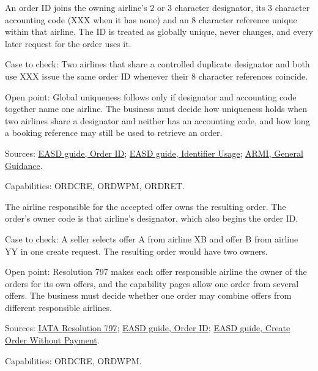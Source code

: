\begin{definition}[Order ID (C-77)]
  \label{def:order-creation-order-id}
  \notready
  An order ID joins the owning airline's 2 or 3 character designator, its 3
  character accounting code (XXX when it has none) and an 8 character
  reference unique within that airline. The ID is treated as globally
  unique, never changes, and every later request for the order uses it.

  Case to check: Two airlines that share a controlled duplicate designator
  and both use XXX issue the same order ID whenever their 8 character
  references coincide.

  Open point: Global uniqueness follows only if designator and accounting
  code together name one airline. The business must decide how uniqueness
  holds when two airlines share a designator and neither has an accounting
  code, and how long a booking reference may still be used to retrieve an
  order.

  Sources: \href{https://standards.atlassian.net/wiki/spaces/EASD/pages/574259647/Order+ID}{EASD guide, Order ID};
  \href{https://standards.atlassian.net/wiki/spaces/EASD/pages/574226512/Identifier+Usage}{EASD guide, Identifier Usage};
  \href{https://standards.atlassian.net/wiki/spaces/ARMI/pages/584318980/General+Guidance}{ARMI, General Guidance}.

  Capabilities: ORDCRE, ORDWPM, ORDRET.
\end{definition}

\begin{theorem}
  \label{thm:order-creation-order-owner}
  \notready
  The airline responsible for the accepted offer owns the resulting order.
  The order's owner code is that airline's designator, which also begins the
  order ID.

  Case to check: A seller selects offer A from airline XB and offer B from
  airline YY in one create request. The resulting order would have two
  owners.

  Open point: Resolution 797 makes each offer responsible airline the owner
  of the orders for its own offers, and the capability pages allow one order
  from several offers. The business must decide whether one order may
  combine offers from different responsible airlines.

  Sources: \href{https://www.iata.org/contentassets/72cbd60393ff42b5975d90ce9e049a7d/oneorder-resolution-797.pdf}{IATA Resolution 797};
  \href{https://standards.atlassian.net/wiki/spaces/EASD/pages/574259647/Order+ID}{EASD guide, Order ID};
  \href{https://standards.atlassian.net/wiki/spaces/EASD/pages/574455879/Create+Order+Without+Payment}{EASD guide, Create Order Without Payment}.

  Capabilities: ORDCRE, ORDWPM.
\end{theorem}

